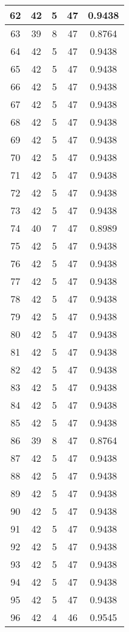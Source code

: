 \documentclass[letterpaper, 12pt]{article}
\begin{document}
\begin{longtable}{|c|c|c|c|c|}
\hline
62 & 42 & 5 & 47 & 0.9438 \\
\hline
63 & 39 & 8 & 47 & 0.8764 \\
\hline
64 & 42 & 5 & 47 & 0.9438 \\
\hline
65 & 42 & 5 & 47 & 0.9438 \\
\hline
66 & 42 & 5 & 47 & 0.9438 \\
\hline
67 & 42 & 5 & 47 & 0.9438 \\
\hline
68 & 42 & 5 & 47 & 0.9438 \\
\hline
69 & 42 & 5 & 47 & 0.9438 \\
\hline
70 & 42 & 5 & 47 & 0.9438 \\
\hline
71 & 42 & 5 & 47 & 0.9438 \\
\hline
72 & 42 & 5 & 47 & 0.9438 \\
\hline
73 & 42 & 5 & 47 & 0.9438 \\
\hline
74 & 40 & 7 & 47 & 0.8989 \\
\hline
75 & 42 & 5 & 47 & 0.9438 \\
\hline
76 & 42 & 5 & 47 & 0.9438 \\
\hline
77 & 42 & 5 & 47 & 0.9438 \\
\hline
78 & 42 & 5 & 47 & 0.9438 \\
\hline
79 & 42 & 5 & 47 & 0.9438 \\
\hline
80 & 42 & 5 & 47 & 0.9438 \\
\hline
81 & 42 & 5 & 47 & 0.9438 \\
\hline
82 & 42 & 5 & 47 & 0.9438 \\
\hline
83 & 42 & 5 & 47 & 0.9438 \\
\hline
84 & 42 & 5 & 47 & 0.9438 \\
\hline
85 & 42 & 5 & 47 & 0.9438 \\
\hline
86 & 39 & 8 & 47 & 0.8764 \\
\hline
87 & 42 & 5 & 47 & 0.9438 \\
\hline
88 & 42 & 5 & 47 & 0.9438 \\
\hline
89 & 42 & 5 & 47 & 0.9438 \\
\hline
90 & 42 & 5 & 47 & 0.9438 \\
\hline
91 & 42 & 5 & 47 & 0.9438 \\
\hline
92 & 42 & 5 & 47 & 0.9438 \\
\hline
93 & 42 & 5 & 47 & 0.9438 \\
\hline
94 & 42 & 5 & 47 & 0.9438 \\
\hline
95 & 42 & 5 & 47 & 0.9438 \\
\hline
96 & 42 & 4 & 46 & 0.9545 \\

\end{longtable}
\end{document}
